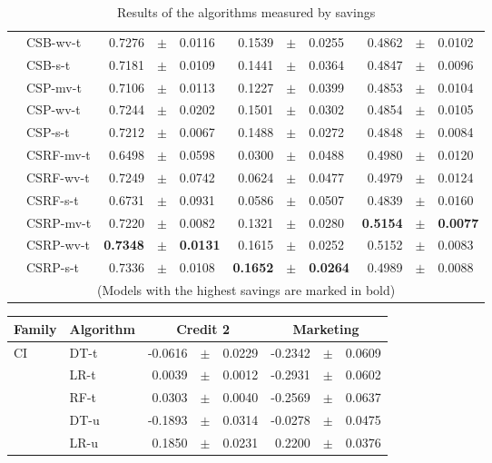 {\begin{table}[!t]
\begin{tabular}{l l r@{\hskip 0in}c@{\hskip 0in}l r@{\hskip 0in}c@{\hskip 0in}l r@{\hskip 
    0in}c@{\hskip 0in}l  }
&CSB-wv-t & 0.7276 &$\pm$& 0.0116 & 0.1539 &$\pm$& 0.0255 & 0.4862 &$\pm$& 0.0102 \\
&CSB-s-t & 0.7181 &$\pm$& 0.0109 & 0.1441 &$\pm$& 0.0364 & 0.4847 &$\pm$& 0.0096 \\
&CSP-mv-t & 0.7106 &$\pm$& 0.0113 & 0.1227 &$\pm$& 0.0399 & 0.4853 &$\pm$& 0.0104 \\
&CSP-wv-t & 0.7244 &$\pm$& 0.0202 & 0.1501 &$\pm$& 0.0302 & 0.4854 &$\pm$& 0.0105 \\
&CSP-s-t & 0.7212 &$\pm$& 0.0067 & 0.1488 &$\pm$& 0.0272 & 0.4848 &$\pm$& 0.0084 \\
&CSRF-mv-t & 0.6498 &$\pm$& 0.0598 & 0.0300 &$\pm$& 0.0488 & 0.4980 &$\pm$& 0.0120 \\
&CSRF-wv-t & 0.7249 &$\pm$& 0.0742 & 0.0624 &$\pm$& 0.0477 & 0.4979 &$\pm$& 0.0124 \\
&CSRF-s-t & 0.6731 &$\pm$& 0.0931 & 0.0586 &$\pm$& 0.0507 & 0.4839 &$\pm$& 0.0160 \\
&CSRP-mv-t & 0.7220 &$\pm$& 0.0082 & 0.1321 &$\pm$& 0.0280 & \bf{0.5154} &\bf{$\pm$}& \bf{0.0077} \\
&CSRP-wv-t & \bf{0.7348} &\bf{$\pm$}& \bf{0.0131} & 0.1615 &$\pm$& 0.0252 & 0.5152 &$\pm$& 0.0083 \\
&CSRP-s-t & 0.7336 &$\pm$& 0.0108 & \bf{0.1652} &\bf{$\pm$}& \bf{0.0264} & 0.4989 &$\pm$& 0.0088 \\
  \hline
  \multicolumn{11}{c}{(Models with the highest savings are marked in bold)}
  \end{tabular}
    \caption{Results of the algorithms measured by savings}
    \label{tab:9:results_savings}
  \end{table}
\begin{table}[!t]
    \centering
    \footnotesize
    \begin{tabular}{l l r@{\hskip 0in}c@{\hskip 0in}l r@{\hskip 0in}c@{\hskip 0in}l  } %
    \hline
    \bf{Family} & \bf{Algorithm} &  \multicolumn{3}{c}{\bf{Credit 2}} 
& \multicolumn{3}{c}{\bf{Marketing}} \\ 
    \hline
CI&DT-t & -0.0616 &$\pm$& 0.0229 & -0.2342 &$\pm$& 0.0609\\ 
&LR-t & 0.0039 &$\pm$& 0.0012 & -0.2931 &$\pm$& 0.0602\\ 
&RF-t & 0.0303 &$\pm$& 0.0040 & -0.2569 &$\pm$& 0.0637\\ 
&DT-u & -0.1893 &$\pm$& 0.0314 & -0.0278 &$\pm$& 0.0475\\ 
&LR-u &  0.1850 &$\pm$& 0.0231 & 0.2200 &$\pm$& 0.0376\\ 

\end{tabular}
\end{table}}
